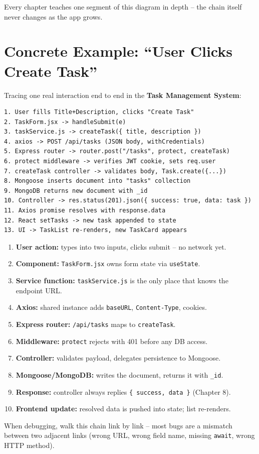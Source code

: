 \begin{notebox}[NOTE]
Every chapter teaches one segment of this diagram in depth -- the chain
itself never changes as the app grows.
\end{notebox}

\section{Concrete Example: ``User Clicks Create Task''}

Tracing one real interaction end to end in the \textbf{Task Management System}:

\begin{diagrambox}
\begin{verbatim}
1. User fills Title+Description, clicks "Create Task"
2. TaskForm.jsx -> handleSubmit(e)
3. taskService.js -> createTask({ title, description })
4. axios -> POST /api/tasks (JSON body, withCredentials)
5. Express router -> router.post("/tasks", protect, createTask)
6. protect middleware -> verifies JWT cookie, sets req.user
7. createTask controller -> validates body, Task.create({...})
8. Mongoose inserts document into "tasks" collection
9. MongoDB returns new document with _id
10. Controller -> res.status(201).json({ success: true, data: task })
11. Axios promise resolves with response.data
12. React setTasks -> new task appended to state
13. UI -> TaskList re-renders, new TaskCard appears
\end{verbatim}
\end{diagrambox}

\begin{enumerate}
  \item \textbf{User action:} types into two inputs, clicks submit -- no network yet.
  \item \textbf{Component:} \texttt{TaskForm.jsx} owns form state via \texttt{useState}.
  \item \textbf{Service function:} \texttt{taskService.js} is the only place that knows the endpoint URL.
  \item \textbf{Axios:} shared instance adds \texttt{baseURL}, \texttt{Content-Type}, cookies.
  \item \textbf{Express router:} \texttt{/api/tasks} maps to \texttt{createTask}.
  \item \textbf{Middleware:} \texttt{protect} rejects with 401 before any DB access.
  \item \textbf{Controller:} validates payload, delegates persistence to Mongoose.
  \item \textbf{Mongoose/MongoDB:} writes the document, returns it with \texttt{\_id}.
  \item \textbf{Response:} controller always replies \texttt{\{ success, data \}} (Chapter 8).
  \item \textbf{Frontend update:} resolved data is pushed into state; list re-renders.
\end{enumerate}

\begin{tipbox}[TIP]
When debugging, walk this chain link by link -- most bugs are a mismatch
between two adjacent links (wrong URL, wrong field name, missing
\texttt{await}, wrong HTTP method).
\end{tipbox}
